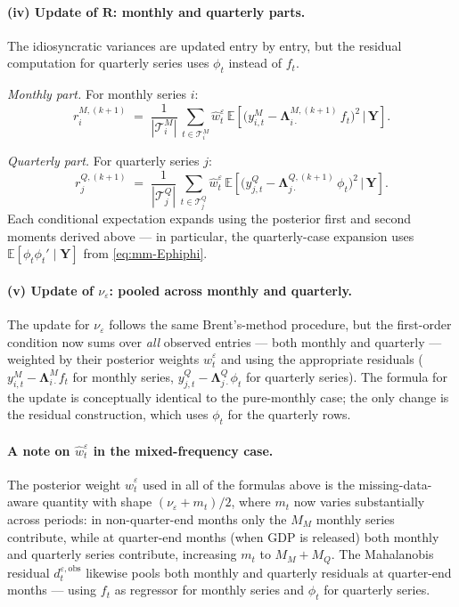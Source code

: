 \documentclass[11pt, a4paper, oneside]{article}
\newcommand{\mY}{\mathbf{Y}}
\newcommand{\mL}{\boldsymbol{\Lambda}}
\newcommand{\mR}{\mathbf{R}}
\begin{document}
\paragraph{(iv) Update of $\mR$: monthly and quarterly parts.}
The idiosyncratic variances are updated entry by entry, but the residual computation for
quarterly series uses $\phi_t$ instead of $f_t$.

\emph{Monthly part.} For monthly series $i$:
\begin{equation}
r^{M,(k+1)}_i \;=\; \frac{1}{|\mathcal{T}^M_i|}\, \sum_{t \in \mathcal{T}^M_i} \hat{w}^\varepsilon_t\, \mathbb{E}\!\left[\big(y^M_{i,t} - \mL^{M,(k+1)}_{i \cdot}\, f_t\big)^2 \,\Big|\, \mY\right].
\label{eq:mm-RM-update}
\end{equation}

\emph{Quarterly part.} For quarterly series $j$:
\begin{equation}
r^{Q,(k+1)}_j \;=\; \frac{1}{|\mathcal{T}^Q_j|}\, \sum_{t \in \mathcal{T}^Q_j} \hat{w}^\varepsilon_t\, \mathbb{E}\!\left[\big(y^Q_{j,t} - \mL^{Q,(k+1)}_{j \cdot}\, \phi_t\big)^2 \,\Big|\, \mY\right].
\label{eq:mm-RQ-update}
\end{equation}
Each conditional expectation expands using the posterior first and
second moments derived above — in particular, the quarterly-case
expansion uses $\mathbb{E}[\phi_t \phi_t' \mid \mY]$ from
\eqref{eq:mm-Ephiphi}.

\paragraph{(v) Update of $\nu_\varepsilon$: pooled across monthly and quarterly.}
The update for $\nu_\varepsilon$ follows the same Brent's-method
procedure, but the first-order
condition now sums over \emph{all} observed entries — both monthly
and quarterly — weighted by their posterior weights
$\hat{w}^\varepsilon_t$ and using the appropriate residuals
($y^M_{i,t} - \mL^M_{i\cdot} f_t$ for monthly series,
$y^Q_{j,t} - \mL^Q_{j\cdot} \phi_t$ for quarterly series). The formula
for the update is conceptually identical to the pure-monthly case; the
only change is the residual construction, which uses $\phi_t$ for the
quarterly rows.

\paragraph{A note on $\hat{w}^\varepsilon_t$ in the mixed-frequency case.}
The posterior weight $\hat{w}^\varepsilon_t$ used in all of the
formulas above is the missing-data-aware quantity with shape
$(\nu_\varepsilon + m_t)/2$, where $m_t$ now varies substantially
across periods: in non-quarter-end months only the $M_M$ monthly
series contribute, while at quarter-end months (when GDP is released)
both monthly and quarterly series contribute, increasing $m_t$ to
$M_M + M_Q$. The Mahalanobis residual $d^{\varepsilon, \mathrm{obs}}_t$
likewise pools both monthly and quarterly residuals at quarter-end
months — using $f_t$ as regressor for monthly series and $\phi_t$
for quarterly series.
\end{document}
